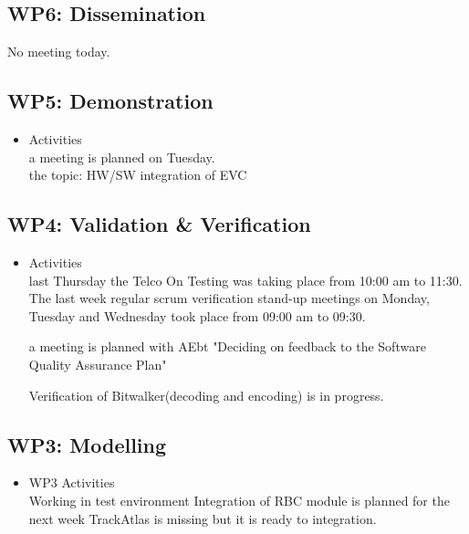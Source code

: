 \documentclass[a4paper, 11pt]{article}
\begin{document}
\subsection{WP6: Dissemination}

 No meeting today.
 
\subsection{WP5: Demonstration}

\begin{itemize}
\item Activities\\

a meeting is planned on Tuesday.\\


the topic: HW/SW integration of EVC  \\

\end{itemize}

\subsection{WP4: Validation \& Verification}
\begin{itemize}
\item Activities\\

  
last Thursday the Telco On Testing was taking place from 10:00 am  to 11:30. 
The last week regular scrum verification stand-up meetings on Monday, Tuesday and Wednesday  took place from 09:00 am to 09:30.

a meeting is planned with AEbt 
"Deciding on feedback to the Software Quality Assurance Plan"

Verification of Bitwalker(decoding and encoding) is in progress.
\end{itemize}

\subsection{WP3: Modelling}

\begin{itemize}
\item WP3 Activities\\
Working in test environment
Integration of RBC module is planned for the next week
TrackAtlas is missing but it is ready to integration.

\end{itemize}
\end{document}

